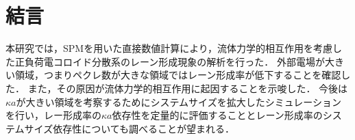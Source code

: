 \section{\large 結言}
\par 本研究では，SPMを用いた直接数値計算により，流体力学的相互作用を考慮した正負荷電コロイド分散系のレーン形成現象の解析を行った．
外部電場が大きい領域，つまりペクレ数が大きな領域ではレーン形成率が低下することを確認した．
また，その原因が流体力学的相互作用に起因することを示唆した．
今後は$\kappa a$が大きい領域を考察するためにシステムサイズを拡大したシミュレーションを行い，レー形成率の$\kappa a$依存性を定量的に評価することとレーン形成率のシステムサイズ依存性についても調べることが望まれる．
